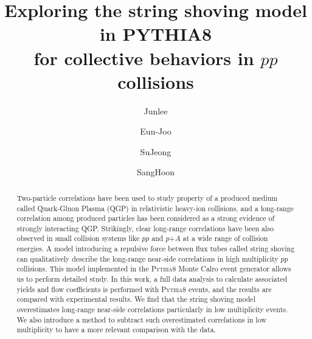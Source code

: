 \documentclass[jkps,preprint,fleqn,showpacs,showkeys]{revtex4}
\newcommand{\pythia}{\textsc{Pythia8}\xspace}
\begin{document}
\setcounter{page}{0}
\title[]{Exploring the string shoving model in PYTHIA8 \\for collective behaviors in $pp$ collisions}
\author{Junlee }
\author{Eun-Joo }
\author{SuJeong }
\author{SangHoon }


\begin{abstract}
Two-particle correlations have been used to study property of a produced medium called Quark-Gluon Plasma (QGP) in relativistic heavy-ion collisions, and a long-range correlation among produced particles has been considered as a strong evidence of strongly interacting QGP. 
Strikingly, clear long-range correlations have been also observed in small collision systems like $pp$ and $p$+$A$ at a wide range of collision energies. 
A model introducing a repulsive force between flux tubes called string shoving can qualitatively describe the long-range near-side correlations in high multiplicity $pp$ collisions. 
This model implemented in the \pythia Monte Calro event generator allows us to perform detailed study.
In this work, a full data analysis to calculate associated yields and flow coefficients is performed with \pythia events, and the results are compared with experimental results.
We find that the string shoving model overestimates long-range near-side correlations particularly in low multiplicity events.
We also introduce a method to subtract such overestimated correlations in low multiplicity to have a more relevant comparison with the data. 

\end{abstract}

\maketitle
\end{document}
